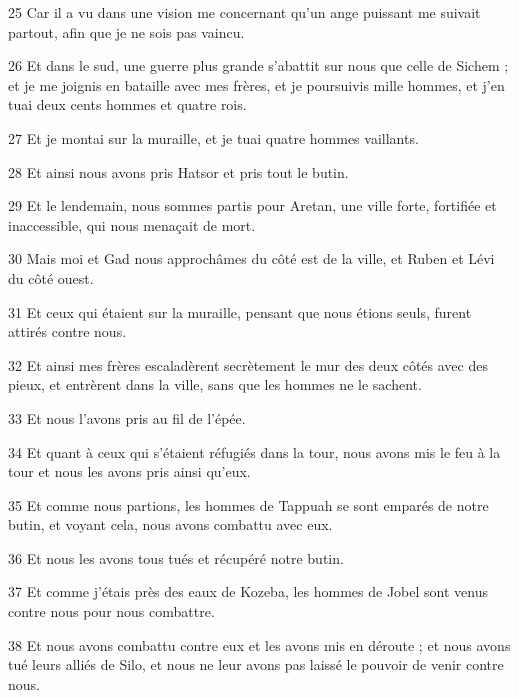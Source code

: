 \par 25 Car il a vu dans une vision me concernant qu'un ange puissant me suivait partout, afin que je ne sois pas vaincu.

\par 26 Et dans le sud, une guerre plus grande s'abattit sur nous que celle de Sichem ; et je me joignis en bataille avec mes frères, et je poursuivis mille hommes, et j'en tuai deux cents hommes et quatre rois.

\par 27 Et je montai sur la muraille, et je tuai quatre hommes vaillants.

\par 28 Et ainsi nous avons pris Hatsor et pris tout le butin.

\par 29 Et le lendemain, nous sommes partis pour Aretan, une ville forte, fortifiée et inaccessible, qui nous menaçait de mort.

\par 30 Mais moi et Gad nous approchâmes du côté est de la ville, et Ruben et Lévi du côté ouest.

\par 31 Et ceux qui étaient sur la muraille, pensant que nous étions seuls, furent attirés contre nous.

\par 32 Et ainsi mes frères escaladèrent secrètement le mur des deux côtés avec des pieux, et entrèrent dans la ville, sans que les hommes ne le sachent.

\par 33 Et nous l'avons pris au fil de l'épée.

\par 34 Et quant à ceux qui s'étaient réfugiés dans la tour, nous avons mis le feu à la tour et nous les avons pris ainsi qu'eux.

\par 35 Et comme nous partions, les hommes de Tappuah se sont emparés de notre butin, et voyant cela, nous avons combattu avec eux.

\par 36 Et nous les avons tous tués et récupéré notre butin.

\par 37 Et comme j'étais près des eaux de Kozeba, les hommes de Jobel sont venus contre nous pour nous combattre.

\par 38 Et nous avons combattu contre eux et les avons mis en déroute ; et nous avons tué leurs alliés de Silo, et nous ne leur avons pas laissé le pouvoir de venir contre nous.

